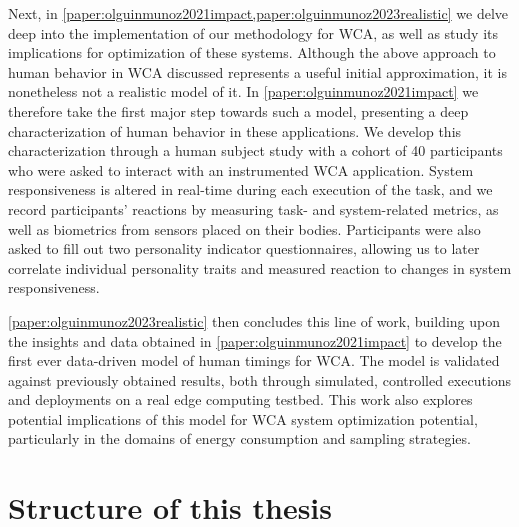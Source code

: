 Next, in \cref{paper:olguinmunoz2021impact,paper:olguinmunoz2023realistic} we delve deep into the implementation of our methodology for \ac{WCA}, as well as study its implications for optimization of these systems.
Although the above approach to human behavior in \ac{WCA} discussed represents a useful initial approximation, it is nonetheless not a realistic model of it.
In \cref{paper:olguinmunoz2021impact} we therefore take the first major step towards such a model, presenting a deep characterization of human behavior in these applications.
We develop this characterization through a human subject study with a cohort of \num{40} participants who were asked to interact with an instrumented \ac{WCA} application.
System responsiveness is altered in real-time during each execution of the task, and we record participants' reactions by measuring task- and system-related metrics, as well as biometrics from sensors placed on their bodies.
Participants were also asked to fill out two personality indicator questionnaires, allowing us to later correlate individual personality traits and measured reaction to changes in system responsiveness.

\cref{paper:olguinmunoz2023realistic} then concludes this line of work, building upon the insights and data obtained in \cref{paper:olguinmunoz2021impact} to develop the first ever data-driven model of human timings for \ac{WCA}.
The model is validated against previously obtained results, both through simulated, controlled executions and deployments on a real edge computing testbed.
This work also explores potential implications of this model for \ac{WCA} system optimization potential, particularly in the domains of energy consumption and sampling strategies.

\section{Structure of this thesis}

